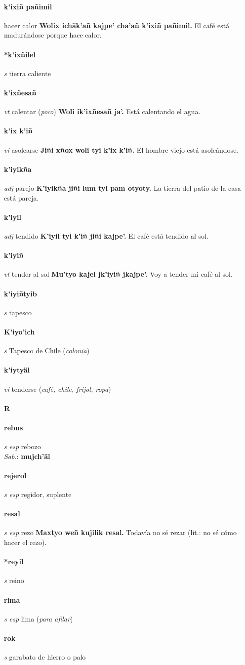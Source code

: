 \documentclass{scrbook}
\newcommand{\entry}[1]{\paragraph{#1}}
\newcommand{\alphaletter}[1]{\addsec{#1}}
\newcommand{\partofspeech}[1]{\textit{#1}}
\newcommand{\spanishtranslation}[1]{#1}
\newcommand{\clarification}[1]{(\textit{#1})}
\newcommand{\cholexample}[1]{\textbf{#1}}
\newcommand{\exampletranslation}[1]{#1}
\newcommand{\dialectvariant}[1]{\\\textit{#1}:}
\newcommand{\dialectword}[1]{\textbf{#1}}
\begin{document}
\begin{multicols}{2}
\entry{k'ixiñ pañimil}
\spanishtranslation{hacer calor}
\cholexample{Wolix ichäk'añ kajpe' cha'añ k'ixiñ pañimil.}
\exampletranslation{El café está madurándose porque hace calor.}

\entry{*k'ixñilel}
\partofspeech{s}
\spanishtranslation{tierra caliente}

\entry{k'ixñesañ}
\partofspeech{vt}
\spanishtranslation{calentar}
\clarification{poco}
\cholexample{Woli ik'ixñesañ ja'.}
\exampletranslation{Está calentando el agua.}

\entry{k'ix k'iñ}
\partofspeech{vi}
\spanishtranslation{asolearse}
\cholexample{Jiñi xñox woli tyi k'ix k'iñ.}
\exampletranslation{El hombre viejo está asoleándose.}

\entry{k'iyikña}
\partofspeech{adj}
\spanishtranslation{parejo}
\cholexample{K'iyikña jiñi lum tyi pam otyoty.}
\exampletranslation{La tierra del patio de la casa está pareja.}

\entry{k'iyil}
\partofspeech{adj}
\spanishtranslation{tendido}
\cholexample{K'iyil tyi k'iñ jiñi kajpe'.}
\exampletranslation{El café está tendido al sol.}

\entry{k'iyiñ}
\partofspeech{vt}
\spanishtranslation{tender al sol}
\cholexample{Mu'tyo kajel jk'iyiñ jkajpe'.}
\exampletranslation{Voy a tender mi café al sol.}

\entry{k'iyiñtyib}
\partofspeech{s}
\spanishtranslation{tapesco}

\entry{K'iyo'ich}
\partofspeech{s}
\spanishtranslation{Tapesco de Chile}
\clarification{colonia}

\entry{k'iytyäl}
\partofspeech{vi}
\spanishtranslation{tenderse}
\clarification{café, chile, frijol, ropa}

\entry{R}
\alphaletter{R}

\entry{rebus}
\partofspeech{s esp}
\spanishtranslation{rebozo}
\dialectvariant{Sab.}
\dialectword{mujch'äl}

\entry{rejerol}
\partofspeech{s esp}
\spanishtranslation{regidor, suplente}

\entry{resal}
\partofspeech{s esp}
\spanishtranslation{rezo}
\cholexample{Maxtyo weñ kujilik resal.}
\exampletranslation{Todavía no sé rezar (lit.: no sé cómo hacer el rezo).}

\entry{*reyil}
\partofspeech{s}
\spanishtranslation{reino}

\entry{rima}
\partofspeech{s esp}
\spanishtranslation{lima}
\clarification{para afilar}

\entry{rok}
\partofspeech{s}
\spanishtranslation{garabato de hierro o palo}


\end{multicols}
\end{document}
